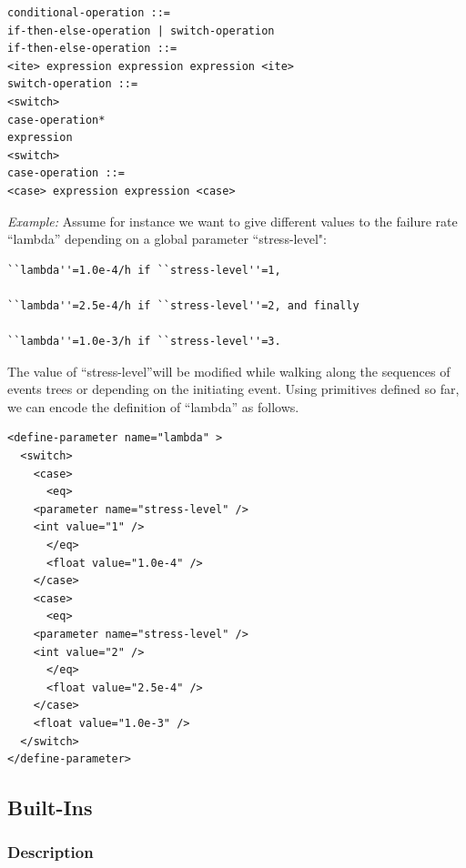 \documentclass[11pt]{article}
\begin{document}
\begin{lstlisting}
conditional-operation ::=
if-then-else-operation | switch-operation
if-then-else-operation ::=
<ite> expression expression expression <ite>
switch-operation ::=
<switch>
case-operation*
expression
<switch>
case-operation ::=
<case> expression expression <case>
\end{lstlisting}



\emph{Example:} Assume for instance we want to give different values to the
failure rate ``lambda'' depending on a global parameter ``stress-level":

\lstset{language=[LaTeX]TeX,label= ,caption= ,captionpos=b,numbers=none}
\begin{lstlisting}
``lambda''=1.0e-4/h if ``stress-level''=1,

``lambda''=2.5e-4/h if ``stress-level''=2, and finally

``lambda''=1.0e-3/h if ``stress-level''=3.
\end{lstlisting}

The value of ``stress-level''will be modified while walking along the
sequences of events trees or depending on the initiating event. Using
primitives defined so far, we can encode the definition of ``lambda'' as
follows.


\lstset{language=XML,label= ,caption= ,captionpos=b,numbers=none}
\begin{lstlisting}
<define-parameter name="lambda" >
  <switch>
    <case>
      <eq>
	<parameter name="stress-level" />
	<int value="1" />
      </eq>
      <float value="1.0e-4" />
    </case>
    <case>
      <eq>
	<parameter name="stress-level" />
	<int value="2" />
      </eq>
      <float value="2.5e-4" />
    </case>
    <float value="1.0e-3" />
  </switch>
</define-parameter>
\end{lstlisting}

\subsection{Built-Ins}
\label{sec:org6e86502}


\subsubsection{Description}
\label{sec:org44a926f}
\end{document}
